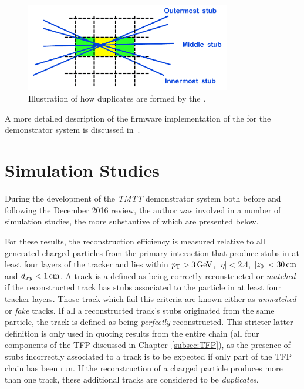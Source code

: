 \begin{figure}[!h]
\centering
\includegraphics[width=0.80\textwidth]{figs/tk-upgrade/A50_algo.pdf}
\caption{Illustration of how duplicates are formed by the \rphi \HT.}
\label{fig:DR}
\end{figure}

A more detailed description of the firmware implementation of the \DR for the demonstrator system is discussed in~\cite{TMTT_JINST}.

\section{Simulation Studies}\label{sec:TmttSimStudies}
During the development of the \emph{TMTT} demonstrator system both before and following the December 2016 review, the author was involved in a number of simulation studies, the more substantive of which are presented below.

For these results, the reconstruction efficiency is measured relative to all generated charged particles from the primary interaction that produce stubs in at least four layers of the tracker and lies within $p_{\mathrm{T}} > 3\,\text{Ge\hspace{-.08em}V}$, $|\eta| < 2.4$, $|z_{0}| < 30\,\text{cm}$ and $d_{xy} < 1\,\text{cm}$.
A track is a defined as being correctly reconstructed or \emph{matched} if the reconstructed track has stubs associated to the particle in at least four tracker layers.
Those track which fail this criteria are known either as \emph{unmatched} or \emph{fake} tracks.
If all a reconstructed track's stubs originated from the same particle, the track is defined as being \emph{perfectly} reconstructed.
This stricter latter definition is only used in quoting results from the entire chain (\ie all four components of the TFP discussed in Chapter~\ref{subsec:TFP}), as the presence of stubs incorrectly associated to a track is to be expected if only part of the TFP chain has been run.
If the reconstruction of a charged particle produces more than one track, these additional tracks are considered to be \emph{duplicates}.

